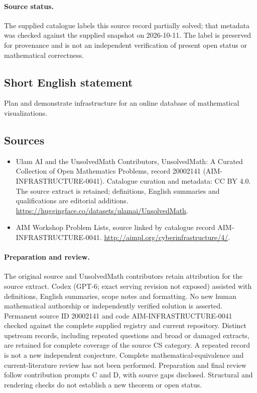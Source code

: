 \documentclass[11pt]{article}
\begin{document}
\paragraph{Source status.}
The supplied catalogue labels this source record partially solved; that metadata was checked against the supplied snapshot on 2026-10-11. The label is preserved for provenance and is not an independent verification of present open status or mathematical correctness.
\subsection{Short English statement}
Plan and demonstrate infrastructure for an online database of mathematical visualizations.
\subsection{Sources}
\begin{itemize}
\item[\hypertarget{source:20002141:1}{S1}] Ulam AI and the UnsolvedMath Contributors, UnsolvedMath: A Curated Collection of Open Mathematics Problems, record 20002141 (AIM-INFRASTRUCTURE-0041). Catalogue curation and metadata: CC BY 4.0. The source extract is retained; definitions, English summaries and qualifications are editorial additions.
\url{https://huggingface.co/datasets/ulamai/UnsolvedMath}.
\item[\hypertarget{source:20002141:2}{S2}] AIM Workshop Problem Lists, source linked by catalogue record AIM-INFRASTRUCTURE-0041.
\url{http://aimpl.org/cyberinfrastructure/4/}.
\end{itemize}
\paragraph{Preparation and review.}
The original source and UnsolvedMath contributors retain attribution for the source extract. Codex (GPT-6; exact serving revision not exposed) assisted with definitions, English summaries, scope notes and formatting. No new human mathematical authorship or independently verified solution is asserted. Permanent source ID 20002141 and code AIM-INFRASTRUCTURE-0041 checked against the complete supplied registry and current repository. Distinct upstream records, including repeated questions and broad or damaged extracts, are retained for complete coverage of the source CS category. A repeated record is not a new independent conjecture. Complete mathematical-equivalence and current-literature review has not been performed. Preparation and final review follow contribution prompts C and D, with source gaps disclosed. Structural and rendering checks do not establish a new theorem or open status.
\label{end:20002141}
\end{document}
